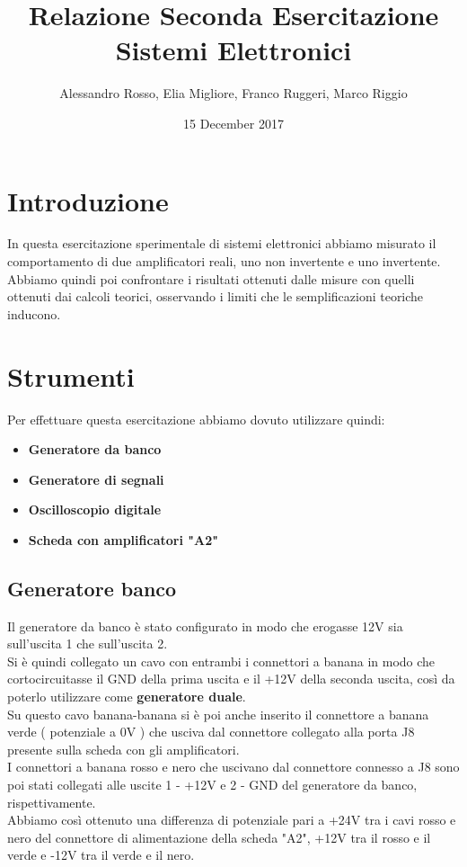 \documentclass{article}
\author{Alessandro Rosso, Elia Migliore, Franco Ruggeri, Marco Riggio}
\title{Relazione Seconda Esercitazione Sistemi Elettronici}
\date{15 December 2017}
\begin{document}
\section{Introduzione}
In questa esercitazione sperimentale di sistemi elettronici abbiamo misurato il comportamento di due amplificatori reali, uno non invertente e uno invertente.\\Abbiamo quindi poi confrontare i risultati ottenuti dalle misure con quelli ottenuti dai calcoli teorici, osservando i limiti che le semplificazioni teoriche inducono.

\section{Strumenti}
Per effettuare questa esercitazione abbiamo dovuto utilizzare quindi:
\begin{itemize}
    \item \textbf{Generatore da banco}
    \item \textbf{Generatore di segnali}
    \item \textbf{Oscilloscopio digitale}
    \item \textbf{Scheda con amplificatori "A2"}
\end{itemize}

\subsection{Generatore banco}
Il generatore da banco è stato configurato in modo che erogasse 12V sia sull'uscita 1 che sull'uscita 2.\\
Si è quindi collegato un cavo con entrambi i connettori a banana in modo che cortocircuitasse il GND della prima uscita e il +12V della seconda uscita, così da poterlo utilizzare come \textbf{generatore duale}.\\ Su questo cavo banana-banana si è poi anche inserito il connettore a banana verde ( potenziale a 0V ) che usciva dal connettore collegato alla porta J8 presente sulla scheda con gli amplificatori.\\
I connettori a banana rosso e nero che uscivano dal connettore connesso a J8 sono poi stati collegati alle uscite 1 - +12V e 2 - GND del generatore da banco, rispettivamente.\\
Abbiamo così ottenuto una differenza di potenziale pari a +24V tra i cavi rosso e nero del connettore di alimentazione della scheda "A2", +12V tra il rosso e il verde e -12V tra il verde e il nero.
\end{document}
